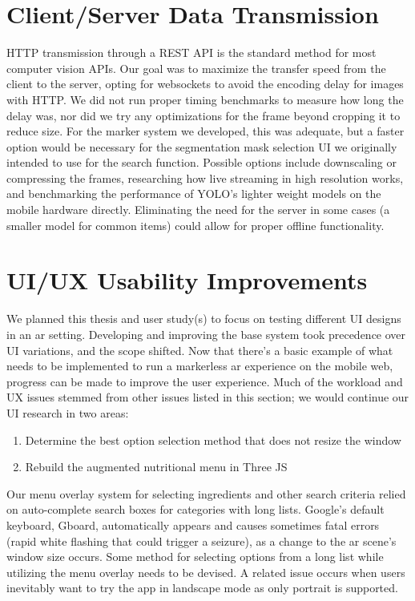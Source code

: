 \documentclass[thesis]{fputhesis}
\begin{document}
\begin{body}
\section{Client/Server Data Transmission}
HTTP transmission through a REST API is the standard method for most computer vision APIs. Our goal was to maximize the transfer speed from the client to the server, opting for websockets to avoid the encoding delay for images with HTTP. We did not run proper timing benchmarks to measure how long the delay was, nor did we try any optimizations for the frame beyond cropping it to reduce size. For the marker system we developed, this was adequate, but a faster option would be necessary for the segmentation mask selection UI we originally intended to use for the search function. Possible options include downscaling or compressing the frames, researching how live streaming in high resolution works, and benchmarking the performance of YOLO's lighter weight models on the mobile hardware directly. Eliminating the need for the server in some cases (a smaller model for common items) could allow for proper offline functionality.

\section{UI/UX Usability Improvements}
We planned this thesis and user study(s) to focus on testing different UI designs in an \acrshort{ar} setting. Developing and improving the base system took precedence over UI variations, and the scope shifted. Now that there's a basic example of what needs to be implemented to run a markerless \acrshort{ar} experience on the mobile web, progress can be made to improve the user experience. Much of the workload and UX issues stemmed from other issues listed in this section; we would continue our UI research in two areas:
\begin{enumerate}
    \item Determine the best option selection method that does not resize the window
    \item Rebuild the augmented nutritional menu in Three JS
\end{enumerate}
Our menu overlay system for selecting ingredients and other search criteria relied on auto-complete search boxes for categories with long lists. Google's default keyboard, Gboard, automatically appears and causes sometimes fatal errors (rapid white flashing that could trigger a seizure), as a change to the \acrshort{ar} scene's window size occurs. Some method for selecting options from a long list while utilizing the menu overlay needs to be devised. A related issue occurs when users inevitably want to try the app in landscape mode as only portrait is supported. 


\end{body}
\end{document}
